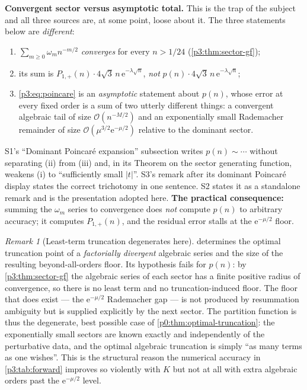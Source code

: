 \documentclass[11pt,a4paper,oneside]{book}
\theoremstyle{plain}
\theoremstyle{definition}
\theoremstyle{remark}
\newtheorem{remark}[theorem]{Remark}
\newcommand{\e}{\mathrm{e}}
\newcommand{\bigO}{\mathcal{O}}
\begin{document}
\begin{repairbox}
\textbf{Convergent sector versus asymptotic total.} This is the trap of the subject and all three
sources are, at some point, loose about it. The three statements below are \emph{different}:
\begin{enumerate}
\item $\sum_{m\ge0}\omega_{m}n^{-m/2}$ \emph{converges} for every $n>1/24$
(\cref{p3:thm:sector-gf});
\item its sum is $P_{1,+}(n)\cdot 4\sqrt3\,n\,\e^{-\lambda\sqrt n}$, \emph{not}
$p(n)\cdot4\sqrt3\,n\,\e^{-\lambda\sqrt n}$;
\item \cref{p3:eq:poincare} is an \emph{asymptotic} statement about $p(n)$,
whose error at every fixed order is a sum of two utterly different things: a convergent algebraic
tail of size $\bigO(n^{-M/2})$ and an exponentially small Rademacher remainder of size
$\bigO(\mu^{3/2}\e^{-\mu/2})$ relative to the dominant sector.
\end{enumerate}
S1's ``Dominant Poincar\'e expansion'' subsection writes $p(n)\sim\cdots$ without separating (ii)
from (iii) and, in its Theorem on the sector generating function, weakens (i) to ``sufficiently
small $|t|$''. S3's remark after its dominant Poincar\'e display states the correct trichotomy in
one sentence. S2 states it as a standalone remark and is the presentation adopted here.
\textbf{The practical consequence:} summing the $\omega_{m}$ series to convergence does \emph{not}
compute $p(n)$ to arbitrary accuracy; it computes $P_{1,+}(n)$, and the residual error stalls at
the $\e^{-\mu/2}$ floor.
\end{repairbox}

\begin{remark}[Least-term truncation degenerates here]\label{p3:rem:no-least-term}
 determines the optimal truncation point of a \emph{factorially
divergent} algebraic series and the size of the resulting beyond-all-orders floor. Its hypothesis
fails for $p(n)$: by \cref{p3:thm:sector-gf} the algebraic series of each sector has a finite
positive radius of convergence, so there is no least term and no truncation-induced floor. The
floor that does exist --- the $\e^{-\mu/2}$ Rademacher gap --- is not produced by resummation
ambiguity but is supplied explicitly by the next sector. The partition function is thus the
degenerate, best possible case of \cref{p0:thm:optimal-truncation}: the exponentially small
sectors are known exactly and independently of the perturbative data, and the optimal algebraic
truncation is simply ``as many terms as one wishes''. This is the structural reason the numerical
accuracy in \cref{p3:tab:forward} improves so violently with $K$ but not at all with extra
algebraic orders past the $\e^{-\mu/2}$ level.
\end{remark}
\end{document}
